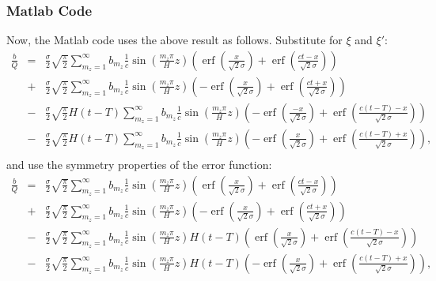\documentclass[12pt]{article}
\DeclareMathOperator\erf {erf}
\begin{document}
\subsubsection{Matlab Code}
%
Now, the Matlab code uses the above result as follows. Substitute for $\xi$ and $\xi'$:
%
\begin{eqnarray}
\frac{b}{Q}  & = & \frac{\sigma}{2} \sqrt{ \frac{\pi}{2} } \sum_{m_z = 1}^{\infty} b_{m_z} \frac{1}{ c }\sin \left( \frac{m_z \pi} {H} z\right) \left(  \erf \left( \frac{x}{\sqrt{2} \sigma} \right) +  \erf \left( \frac{ct-x}{\sqrt{2} \sigma} \right)    \right)  \\ \nonumber
& + & \frac{\sigma}{2}  \sqrt{ \frac{\pi}{2} }  \sum_{m_z = 1}^{\infty} b_{m_z} \frac{ 1 }{ c } \sin \left( \frac{m_z \pi} {H} z\right)\left( - \erf \left( \frac{x}{\sqrt{2} \sigma} \right) + \erf \left( \frac{ct+x }{\sqrt{2} \sigma} \right)    \right) \\ \nonumber
& - & \frac{\sigma}{2}  \sqrt{ \frac{\pi}{2} }H(t-T) \sum_{m_z = 1}^{\infty} b_{m_z}  \frac{1 }{ c }  \sin \left( \frac{m_z \pi} {H} z\right) \left(- \erf \left( \frac{-x}{\sqrt{2} \sigma} \right) +  \erf \left( \frac{c(t-T)-x}{\sqrt{2} \sigma} \right)    \right)  \\ \nonumber
& - & \frac{\sigma }{2} \sqrt{ \frac{\pi}{2} }H(t-T)  \sum_{m_z = 1}^{\infty} b_{m_z}  \frac{1}{ c }  \sin \left( \frac{m_z \pi} {H} z\right) \left(- \erf \left( \frac{x}{\sqrt{2} \sigma} \right) +  \erf \left( \frac{c(t-T) + x}{\sqrt{2} \sigma} \right)   \right), \\ \nonumber
\end{eqnarray}
%
and use the symmetry properties of the error function:
%
\begin{eqnarray}
\label{equ_Matlab}
\frac{b}{Q}  & = & \frac{\sigma}{2} \sqrt{ \frac{\pi}{2} } \sum_{m_z = 1}^{\infty} b_{m_z} \frac{1}{ c }\sin \left( \frac{m_z \pi} {H} z\right) \left(  \erf \left( \frac{x}{\sqrt{2} \sigma} \right) +  \erf \left( \frac{ct-x}{\sqrt{2} \sigma} \right)    \right)  \\ \nonumber
& + & \frac{\sigma}{2}  \sqrt{ \frac{\pi}{2} }  \sum_{m_z = 1}^{\infty} b_{m_z} \frac{ 1 }{ c } \sin \left( \frac{m_z \pi} {H} z\right)\left( - \erf \left( \frac{x}{\sqrt{2} \sigma} \right) + \erf \left( \frac{ct+x }{\sqrt{2} \sigma} \right)    \right) \\ \nonumber
& - & \frac{\sigma}{2}  \sqrt{ \frac{\pi}{2} } \sum_{m_z = 1}^{\infty} b_{m_z}  \frac{1 }{ c }  \sin \left( \frac{m_z \pi} {H} z\right) H(t-T)\left( \erf \left( \frac{x}{\sqrt{2} \sigma} \right) +  \erf \left( \frac{c(t-T)-x}{\sqrt{2} \sigma} \right)    \right)  \\ \nonumber
& - & \frac{\sigma }{2} \sqrt{ \frac{\pi}{2} }  \sum_{m_z = 1}^{\infty} b_{m_z}  \frac{1}{ c }  \sin \left( \frac{m_z \pi} {H} z\right) H(t-T)\left(- \erf \left( \frac{x}{\sqrt{2} \sigma} \right) +  \erf \left( \frac{c(t-T) + x}{\sqrt{2} \sigma} \right)    \right), \\ \nonumber
\end{eqnarray}
\end{document}
